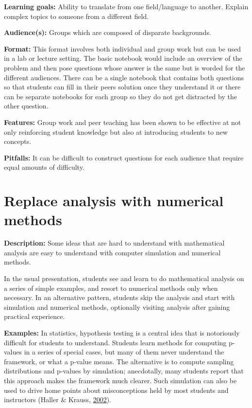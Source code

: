 \documentclass[]{book}
\begin{document}
\textbf{Learning goals:} Ability to translate from one field/language to
another. Explain complex topics to someone from a different field.

\textbf{Audience(s):} Groups which are composed of disparate
backgrounds.

\textbf{Format:} This format involves both individual and group work but
can be used in a lab or lecture setting. The basic notebook would
include an overview of the problem and then pose questions whose answer
is the same but is worded for the different audiences. There can be a
single notebook that contains both questions so that students can fill
in their peers solution once they understand it or there can be separate
notebooks for each group so they do not get distracted by the other
question.

\textbf{Features:} Group work and peer teaching has been shown to be
effective at not only reinforcing student knowledge but also at
introducing students to new concepts.

\textbf{Pitfalls:} It can be difficult to construct questions for each
audience that require equal amounts of difficulty.

\section{Replace analysis with numerical
methods}\label{replace-analysis-with-numerical-methods}

\textbf{Description:} Some ideas that are hard to understand with
mathematical analysis are easy to understand with computer simulation
and numerical methods.

In the usual presentation, students see and learn to do mathematical
analysis on a series of simple examples, and resort to numerical methods
only when necessary. In an alternative pattern, students skip the
analysis and start with simulation and numerical methods, optionally
visiting analysis after gaining practical experience.

\textbf{Examples:} In statistics, hypothesis testing is a central idea
that is notoriously difficult for students to understand. Students learn
methods for computing p-values in a series of special cases, but many of
them never understand the framework, or what a p-value means. The
alternative is to compute sampling distributions and p-values by
simulation; anecdotally, many students report that this approach makes
the framework much clearer. Such simulation can also be used to drive
home points about misconceptions held by most students and instructors
(Haller \& Krauss, \protect\hyperlink{ref-HallerKrauss2002}{2002}).
\end{document}
